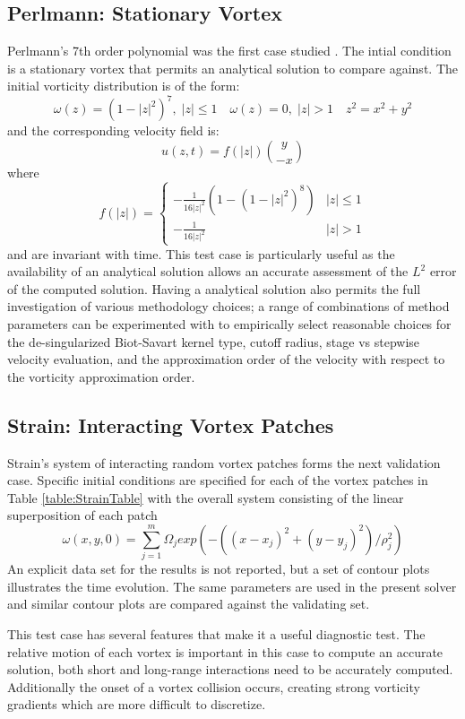 \documentclass[letterpaper,12pt]{report}
\newcommand{\ben}[1]{\begin{equation}\label{#1}}
\newcommand{\ee}{\end{equation}}
\begin{document}
\subsection{Perlmann: Stationary Vortex}
Perlmann's 7th order polynomial was the first case studied \cite{Perlmann1985}. The intial condition is a stationary vortex that permits an analytical solution to compare against. The initial vorticity distribution is of the form:
\ben{PerlW} \omega(z)=(1-|z|^2)^7, \; |z|\leq 1  \quad \omega(z)=0, \;|z|>1 \quad z^2=x^2+y^2 \ee
and the corresponding velocity field is:
\ben{PerlU} u(z,t)=f(|z|)\binom{y}{-x} \ee
where
\[
f(|z|)=
\begin{cases}
    -\frac{1}{16|z|^2}(1-(1-|z|^2)^8)	& |z| \leq 1\\
    -\frac{1}{16|z|^2} 			& |z|>1
\end{cases}
\]
and are invariant with time. This test case is particularly useful as the availability of an analytical solution allows an accurate assessment of the $L^2$ error of the computed solution. Having a analytical solution also permits the full investigation of various methodology choices; a range of combinations of method parameters can be experimented with to empirically select reasonable choices for the de-singularized Biot-Savart kernel type, cutoff radius, stage vs stepwise velocity evaluation, and the approximation order of the velocity with respect to the vorticity approximation order.

\subsection{Strain: Interacting Vortex Patches}
Strain's system of interacting random vortex patches \cite{Strain1996} forms the next validation case. Specific initial conditions are specified for each of the vortex patches in Table \ref{table:StrainTable} with the overall system consisting of the linear superposition of each patch
\ben{StrainV} \omega(x,y,0) = \sum_{j=1}^m \Omega_j exp(-((x-x_j)^2 + (y-y_j)^2)/\rho_j^2) \ee
An explicit data set for the results is not reported, but a set of contour plots illustrates the time evolution. The same parameters are used in the present solver and similar contour plots are compared against the validating set.

This test case has several features that make it a useful diagnostic test. The relative motion of each vortex is important in this case to compute an accurate solution, both short and long-range interactions need to be accurately computed. Additionally the onset of a vortex collision occurs, creating strong vorticity gradients which are more difficult to discretize.
\end{document}
